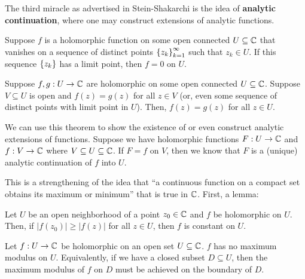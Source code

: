 The third miracle as advertised in Stein-Shakarchi is the idea of \textbf{analytic continuation}, where one may construct extensions of analytic functions.
\begin{theorem}
  Suppose $f$ is a holomorphic function on some open connected $U \subseteq \mathbb C$ that vanishes on a sequence of distinct points $\left\{ z_k \right\}_{k=1}^\infty$ such that $z_k \in U$. If this sequence $\left\{ z_k \right\}$ has a limit point, then $f = 0$ on $U$.
\end{theorem}

\begin{corollary}
  Suppose $f, g : U \to \mathbb C$ are holomorphic on some open connected $U \subseteq \mathbb C$. Suppose $V \subseteq U$ is open and $f(z) = g(z)$ for all $z \in V$ (or, even some sequence of distinct points with limit point in $U$). Then, $f(z) = g(z)$ for all $z \in U$.
\end{corollary}
We can use this theorem to show the existence of or even construct analytic extensions of functions. Suppose we have holomorphic functions $F : U \to \mathbb C$ and $f : V \to \mathbb C$ where $V \subseteq U \subseteq \mathbb C$. If $F = f$ on $V$, then we know that $F$ is a (unique) analytic continuation of $f$ into $U$.

This is a strengthening of the idea that ``a continuous function on a compact set obtains its maximum or minimum'' that is true in $\mathbb C$. First, a lemma:
\begin{lemma}
  Let $U$ be an open neighborhood of a point $z_0 \in \mathbb C$ and $f$ be holomorphic on $U$. Then, if $|f(z_0)| \geq |f(z)|$ for all $z \in U$, then $f$ is constant on $U$.
\end{lemma}

\begin{theorem}
  Let $f : U \to \mathbb C$ be holomorphic on an open set $U \subseteq \mathbb C$. $f$ has no maximum modulus on $U$. Equivalently, if we have a closed subset $D \subseteq U$, then the maximum modulus of $f$ on $D$ must be achieved on the boundary of $D$.
\end{theorem}

\begin{corollary}
\end{corollary}



